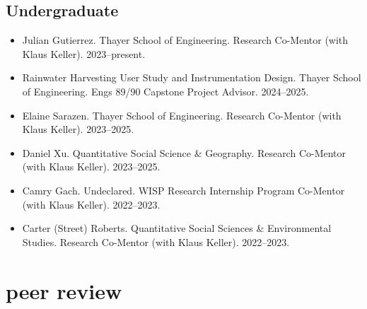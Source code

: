 \documentclass[10pt,oneside]{article}
\begin{document}
\mbox{}\vspace{-\dimexpr\baselineskip\relax}



\subsection{Undergraduate}
\begin{itemize}[label={}]

\item Julian Gutierrez. Thayer School of Engineering. Research Co-Mentor (with Klaus Keller). 2023--present.  

\item Rainwater Harvesting User Study and Instrumentation Design. Thayer School of Engineering. Engs 89/90 Capstone Project Advisor. 2024--2025.  

\item Elaine Sarazen. Thayer School of Engineering. Research Co-Mentor (with Klaus Keller). 2023--2025.  

\item Daniel Xu. Quantitative Social Science \& Geography. Research Co-Mentor (with Klaus Keller). 2023--2025.  

\item Camry Gach. Undeclared. WISP Research Internship Program Co-Mentor (with Klaus Keller). 2022--2023.  

\item Carter (Street) Roberts. Quantitative Social Sciences \& Environmental Studies. Research Co-Mentor (with Klaus Keller). 2022--2023.  

\end{itemize}



\section{peer review}

\mbox{}\vspace{-\dimexpr\baselineskip\relax}
\end{document}
